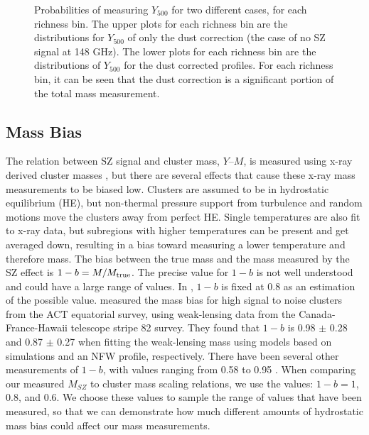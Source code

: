 \documentclass[a4paper,fleqn,usenatbib]{mnras}
\begin{document}
\begin{figure}
  \caption{Probabilities of measuring $Y_{500}$ for two different cases, for each richness bin. The upper plots for each richness bin are the distributions for $Y_{500}$ of only the dust correction (the case of no SZ signal at 148 GHz). The lower plots for each richness bin are the distributions of $Y_{500}$ for the dust corrected profiles. For each richness bin, it can be seen that the dust correction is a significant portion of the total mass measurement.}  
  \label{fig:y500dist}
\end{figure}




\subsection{Mass Bias}



The relation between SZ signal and cluster mass, $Y$--$M$, is measured using x-ray derived cluster masses \citep{2010A&A...517A..92A, 2011ApJ...738...48A}, but there are several effects that cause these x-ray mass measurements to be biased low. Clusters are assumed to be in hydrostatic equilibrium (HE), but non-thermal pressure support from turbulence and random motions move the clusters away from perfect HE. Single temperatures are also fit to x-ray data, but subregions with higher temperatures can be present and get averaged down, resulting in a bias toward measuring a lower temperature and therefore mass. The bias between the true mass and the mass measured by the SZ effect is $1-b = M/M_{\rm true}$. The precise value for $1-b$ is not well understood and could have a large range of values\citep{2014A&A...571A..16P}. In \cite{2014A&A...571A..16P}, $1-b$ is fixed at 0.8 as an estimation of the possible value. \cite{2016JCAP...08..013B} measured the mass bias for high signal to noise clusters from the ACT equatorial survey, using weak-lensing data from the Canada-France-Hawaii telescope stripe 82 survey. They found that $1-b$ is 0.98 $\pm$ 0.28 and 0.87 $\pm$ 0.27 when fitting the weak-lensing mass using models based on simulations and an NFW profile, respectively. There have been several other measurements of $1-b$, with values ranging from 0.58 to 0.95 \citep{2014MNRAS.443.1973V,2015MNRAS.449..685H,2016MNRAS.456L..74S,2016A&A...594A..24P}. When comparing our measured $M_{SZ}$ to cluster mass scaling relations, we use the values: $1-b = 1$, 0.8, and 0.6. We choose these values to sample the range of values that have been measured, so that we can demonstrate how much different amounts of hydrostatic mass bias could affect our mass measurements. 
\end{document}
